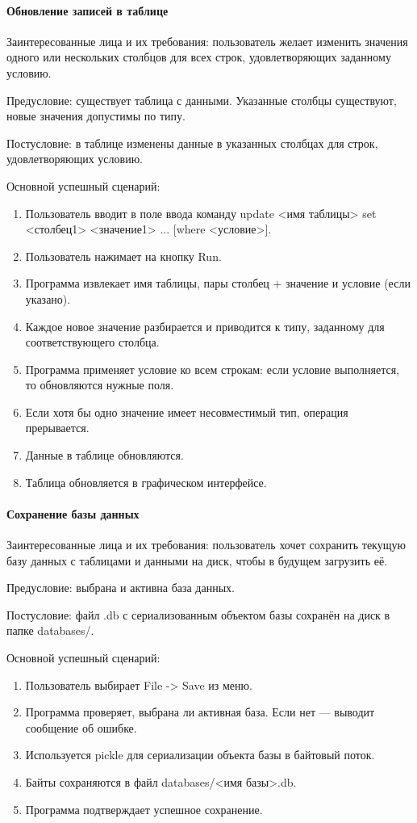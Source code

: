 \paragraph{Обновление записей в таблице}

Заинтересованные лица и их требования: пользователь желает изменить значения одного или нескольких столбцов для всех строк, удовлетворяющих заданному условию.

Предусловие: существует таблица с данными. Указанные столбцы существуют, новые значения допустимы по типу.

Постусловие: в таблице изменены данные в указанных столбцах для строк, удовлетворяющих условию.

Основной успешный сценарий:
\begin{enumerate}
	\item Пользователь вводит в поле ввода команду update <имя таблицы> set <столбец1> <значение1> ... [where <условие>].
	\item Пользователь нажимает на кнопку Run.		
	\item Программа извлекает имя таблицы, пары столбец + значение и условие (если указано).	
	\item Каждое новое значение разбирается и приводится к типу, заданному для соответствующего столбца.	
	\item Программа применяет условие ко всем строкам: если условие выполняется, то обновляются нужные поля.	
	\item Если хотя бы одно значение имеет несовместимый тип, операция прерывается.	
	\item Данные в таблице обновляются.
	\item Таблица обновляется в графическом интерфейсе.
\end{enumerate}

\paragraph{Сохранение базы данных}

Заинтересованные лица и их требования: пользователь хочет сохранить текущую базу данных с таблицами и данными на диск, чтобы в будущем загрузить её.

Предусловие: выбрана и активна база данных.

Постусловие: файл .db с сериализованным объектом базы сохранён на диск в папке databases/.

Основной успешный сценарий:
\begin{enumerate}
	\item Пользователь выбирает File -> Save из меню.	
	\item Программа проверяет, выбрана ли активная база. Если нет — выводит сообщение об ошибке.	
	\item Используется pickle для сериализации объекта базы в байтовый поток.	
	\item Байты сохраняются в файл databases/<имя базы>.db.	
	\item Программа подтверждает успешное сохранение.
\end{enumerate}

